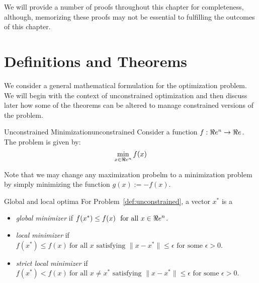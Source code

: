 We will provide a number of proofs throughout this chapter for completeness, although, memorizing these proofs may not be essential to fulfilling the outcomes of this chapter.

\section{Definitions and Theorems}

We consider a general mathematical formulation for the optimization problem.  We will begin with the context of unconstrained optimization and then discuss later how some of the theorems can be altered to manage  constrained versions of the problem.

    \begin{definition}{Unconstrained Minimization}{unconstrained}
        Consider a function $f: \Re e^n \to \Re e$. The problem is given by:
        \[
        \min_{x \in \Re e^n} f(x)
        \]
    \end{definition}





Note that we may change any maximization probelm to a minimization problem by simply minimizing the function $g(x):= -f(x)$.



\begin{definition}{Global and local optima}{}
For Problem~\ref{def:unconstrained}, a vector $x^*$ is a
\begin{itemize}
\item  \emph{global minimizer} if $f(x^*) \leq f(x) \ \mbox{ for all } x \in \Re e^n$.
\item  \emph{local minimizer} if $f(x^*) \leq f(x) \ \text{for all } x \text{ satisfying } \| x- x^*\| \leq \epsilon \text{ for some } \epsilon > 0$.
\item \emph{strict local minimizer} if $f(x^*) < f(x) \ \text{for all } x \neq x^* \text{ satisfying } \| x- x^*\| \leq \epsilon \text{ for some } \epsilon > 0$.
\end{itemize}
\end{definition}


